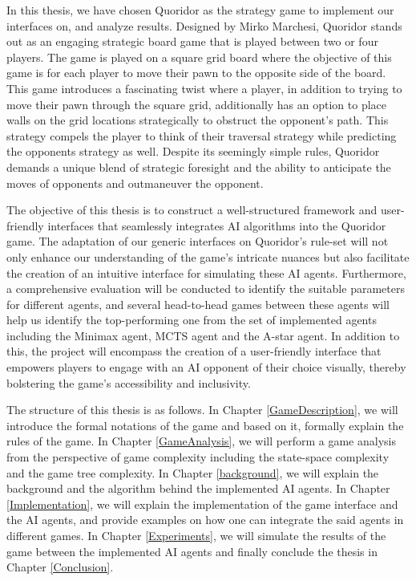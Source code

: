 In this thesis, we have chosen Quoridor as the strategy game to implement our interfaces on, and analyze results. Designed by Mirko Marchesi, Quoridor stands out as an engaging strategic board game that is played between two or four players. The game is played on a square grid board where the objective of this game is for each player to move their pawn to the opposite side of the board. This game introduces a fascinating twist where a player, in addition to trying to move their pawn through the square grid, additionally has an option to place walls on the grid locations strategically to obstruct the opponent's path. This strategy compels the player to think of their traversal strategy while predicting the opponents strategy as well. Despite its seemingly simple rules, Quoridor demands a unique blend of strategic foresight and the ability to anticipate the moves of opponents and outmaneuver the opponent.

The objective of this thesis is to construct a well-structured framework and user-friendly interfaces that seamlessly integrates AI algorithms into the Quoridor game. The adaptation of our generic interfaces on Quoridor's rule-set will not only enhance our understanding of the game's intricate nuances but also facilitate the creation of an intuitive interface for simulating these AI agents. Furthermore, a comprehensive evaluation will be conducted to identify the suitable parameters for different agents, and several head-to-head games between these agents will help us identify the top-performing one from the set of implemented agents including the Minimax agent, \gls{MCTS} agent and the A-star agent. In addition to this, the project will encompass the creation of a user-friendly interface that empowers players to engage with an AI opponent of their choice visually, thereby bolstering the game's accessibility and inclusivity.

The structure of this thesis is as follows. In Chapter \ref{GameDescription}, we will introduce the formal notations of the game and based on it, formally explain the rules of the game. In Chapter \ref{GameAnalysis}, we will perform a game analysis from the perspective of game complexity including the state-space complexity and the game tree complexity. In Chapter \ref{background}, we will explain the background and the algorithm behind the implemented AI agents.  In Chapter \ref{Implementation}, we will explain the implementation of the game interface and the AI agents, and provide examples on how one can integrate the said agents in different games. In Chapter \ref{Experiments}, we will simulate the results of the game between the implemented AI agents and finally conclude the thesis in Chapter \ref{Conclusion}.
